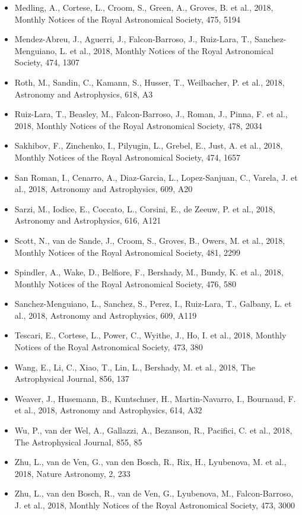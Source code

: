 \documentclass{letter}
\begin{document}
\begin{enumerate}
\begin{itemize}
\item Medling, A., Cortese, L., Croom, S., Green, A., Groves, B. et al., 2018, Monthly Notices of the Royal Astronomical Society, 475, 5194
\item Mendez-Abreu, J., Aguerri, J., Falcon-Barroso, J., Ruiz-Lara, T., Sanchez-Menguiano, L. et al., 2018, Monthly Notices of the Royal Astronomical Society, 474, 1307
\item Roth, M., Sandin, C., Kamann, S., Husser, T., Weilbacher, P. et al., 2018, Astronomy and Astrophysics, 618, A3
\item Ruiz-Lara, T., Beasley, M., Falcon-Barroso, J., Roman, J., Pinna, F. et al., 2018, Monthly Notices of the Royal Astronomical Society, 478, 2034
\item Sakhibov, F., Zinchenko, I., Pilyugin, L., Grebel, E., Just, A. et al., 2018, Monthly Notices of the Royal Astronomical Society, 474, 1657
\item San Roman, I., Cenarro, A., Diaz-Garcia, L., Lopez-Sanjuan, C., Varela, J. et al., 2018, Astronomy and Astrophysics, 609, A20
\item Sarzi, M., Iodice, E., Coccato, L., Corsini, E., de Zeeuw, P. et al., 2018, Astronomy and Astrophysics, 616, A121
\item Scott, N., van de Sande, J., Croom, S., Groves, B., Owers, M. et al., 2018, Monthly Notices of the Royal Astronomical Society, 481, 2299
\item Spindler, A., Wake, D., Belfiore, F., Bershady, M., Bundy, K. et al., 2018, Monthly Notices of the Royal Astronomical Society, 476, 580
\item Sanchez-Menguiano, L., Sanchez, S., Perez, I., Ruiz-Lara, T., Galbany, L. et al., 2018, Astronomy and Astrophysics, 609, A119
\item Tescari, E., Cortese, L., Power, C., Wyithe, J., Ho, I. et al., 2018, Monthly Notices of the Royal Astronomical Society, 473, 380
\item Wang, E., Li, C., Xiao, T., Lin, L., Bershady, M. et al., 2018, The Astrophysical Journal, 856, 137
\item Weaver, J., Husemann, B., Kuntschner, H., Martin-Navarro, I., Bournaud, F. et al., 2018, Astronomy and Astrophysics, 614, A32
\item Wu, P., van der Wel, A., Gallazzi, A., Bezanson, R., Pacifici, C. et al., 2018, The Astrophysical Journal, 855, 85
\item Zhu, L., van de Ven, G., van den Bosch, R., Rix, H., Lyubenova, M. et al., 2018, Nature Astronomy, 2, 233
\item Zhu, L., van den Bosch, R., van de Ven, G., Lyubenova, M., Falcon-Barroso, J. et al., 2018, Monthly Notices of the Royal Astronomical Society, 473, 3000

\end{itemize}
\end{enumerate}
\end{document}
